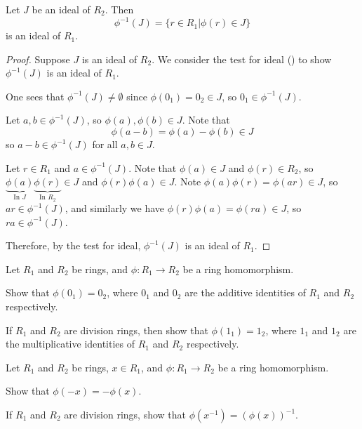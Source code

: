 \begin{proposition}\label{prop-inverse-homomorphism-on-ideal-is-ideal}
    Let $J$ be an ideal of $R_2$. Then
    \[
        \phi^{-1}(J) = \{r \in R_1 \vert \phi(r) \in J\}
    \]
    is an ideal of $R_1$.
\end{proposition}
\begin{proof}
    Suppose $J$ is an ideal of $R_2$. We consider the test for ideal () to show $\phi^{-1}(J)$ is an ideal of $R_1$.

    One sees that $\phi^{-1}(J) \neq \emptyset$ since $\phi(0_1) = 0_2 \in J$, so $0_1 \in \phi^{-1}(J)$.

    Let $a, b \in \phi^{-1}(J)$, so $\phi(a), \phi(b) \in J$. Note that
    \[
        \phi(a-b) = \phi(a) - \phi(b) \in J
    \]
    so $a-b \in \phi^{-1}(J)$ for all $a,b \in J$.

    Let $r \in R_1$ and $a \in \phi^{-1}(J)$. Note that $\phi(a) \in J$ and $\phi(r) \in R_2$, so $\underbrace{\phi(a)}_{\text{In }J}\underbrace{\phi(r)}_{\text{In }R_2} \in J$ and $\phi(r)\phi(a) \in J$. Note $\phi(a)\phi(r) = \phi(ar) \in J$, so $ar \in \phi^{-1}(J)$, and similarly we have $\phi(r)\phi(a) = \phi(ra) \in J$, so $ra \in \phi^{-1}(J)$.

    Therefore, by the test for ideal, $\phi^{-1}(J)$ is an ideal of $R_1$.
\end{proof}

\begin{exercise}\label{exercise-ring-image-of-identity-is-identity}
    Let $R_1$ and $R_2$ be rings, and $\phi: R_1 \to R_2$ be a ring homomorphism.
    \begin{partquestions}{\alph*}
        \item Show that $\phi(0_1) = 0_2$, where $0_1$ and $0_2$ are the additive identities of $R_1$ and $R_2$ respectively.
        \item If $R_1$ and $R_2$ are division rings, then show that $\phi(1_1) = 1_2$, where $1_1$ and $1_2$ are the multiplicative identities of $R_1$ and $R_2$ respectively.
    \end{partquestions}
\end{exercise}

\begin{exercise}\label{exercise-ring-image-of-inverse-is-inverse}
    Let $R_1$ and $R_2$ be rings, $x \in R_1$, and $\phi: R_1 \to R_2$ be a ring homomorphism.
    \begin{partquestions}{\alph*}
        \item Show that $\phi(-x) = -\phi(x)$.
        \item If $R_1$ and $R_2$ are division rings, show that $\phi(x^{-1}) = (\phi(x))^{-1}$.
    \end{partquestions}
\end{exercise}

